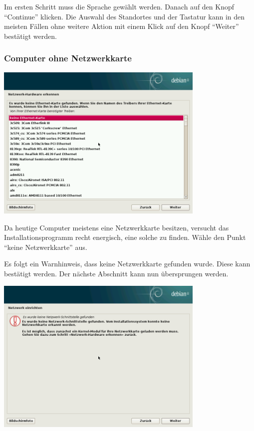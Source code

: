 \documentclass[a4paper,12pt,twoside]{article}
\begin{document}
Im ersten Schritt muss die Sprache gewählt werden. Danach auf den Knopf
"`Continue"' klicken. Die Auswahl des
Standortes und der Tastatur kann in den meisten Fällen ohne weitere
Aktion mit einem Klick auf den Knopf
"`Weiter"' bestätigt werden.


\subsubsection{Computer ohne Netzwerkkarte}
\label{sct:inst_ohne_netzwerk}

\begin{minipage}{\linewidth}
  \centering
  \captionsetup{type=figure}
  \includegraphics[width=10cm]{screenshots/select_network_card.png}
  \label{fig:inst_netzwerkkarte}
\end{minipage}

Da heutige Computer meistens eine Netzwerkkarte besitzen, versucht das
Installationsprogramm recht energisch, eine solche zu finden. Wähle den
Punkt "`keine Netzwerkkarte"' aus.

Es folgt ein Warnhinweis, dass keine Netzwerkkarte gefunden wurde. Diese
kann bestätigt werden. Der nächste Abschnitt kann nun übersprungen
werden.

\bigskip
\begin{minipage}{\linewidth}
  \centering
  \captionsetup{type=figure}
  \includegraphics[width=10cm]{screenshots/message_no_network.png}
  \label{fig:inst_best_netzwerkkarte}
\end{minipage}
\end{document}

